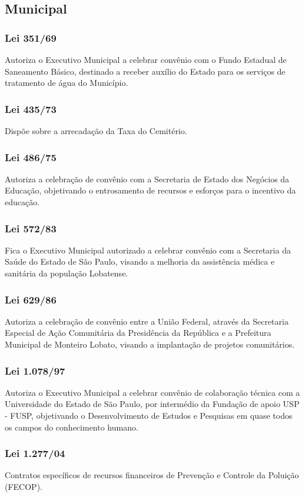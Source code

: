  \begin{subapend}
 	 \subsection{Municipal}
 	\begin{subsubapend}
 		\subsubsection{Lei 351/69}
 		Autoriza o Executivo Municipal a celebrar convênio com o Fundo Estadual de Saneamento Básico, destinado a receber auxílio do Estado para os serviços de tratamento de água do Município.
 		\subsubsection{Lei 435/73}
 		Dispõe sobre a arrecadação da Taxa do Cemitério.
 		\subsubsection{Lei 486/75}
 		Autoriza a celebração de convênio com a Secretaria de Estado dos Negócios da Educação, objetivando o entrosamento de recursos e esforços para o incentivo da educação.
 		\subsubsection{Lei 572/83}
 		Fica o Executivo Municipal autorizado a celebrar convênio com a Secretaria da Saúde do Estado de São Paulo, visando a melhoria da assistência médica e sanitária da população Lobatense.
 		\subsubsection{Lei 629/86}
 		Autoriza a celebração de convênio entre a União Federal, através da Secretaria Especial de Ação Comunitária da Presidência da República e a Prefeitura Municipal de Monteiro Lobato, visando a implantação de projetos comunitários.
 		\subsubsection{Lei 1.078/97}
 		Autoriza o Executivo Municipal a celebrar convênio de colaboração técnica com a Universidade do Estado de São Paulo, por intermédio da Fundação de apoio USP - FUSP, objetivando o Desenvolvimento de Estudos e Pesquisas em quase todos os campos do conhecimento humano.
 		\subsubsection{Lei 1.277/04}
 		Contratos específicos de recursos financeiros de Prevenção e Controle da Poluição (FECOP).

\end{subsubapend}
\end{subapend}

